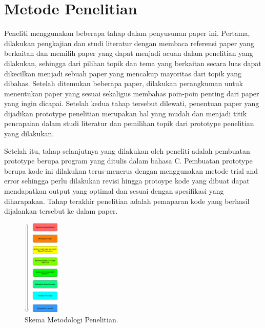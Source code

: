 \documentclass[conference]{IEEEtran}
\begin{document}
\section{Metode Penelitian}
    Peneliti menggunakan beberapa tahap dalam penyusunan
    paper ini. Pertama, dilakukan pengkajian dan studi literatur
    dengan membaca referensi paper yang berkaitan dan memilih
    paper yang dapat menjadi acuan dalam penelitian yang dilakukan, sehingga dari pilihan topik dan tema yang berkaitan
    secara luas dapat dikecilkan menjadi sebuah paper yang mencakup mayoritas dari topik yang dibahas. Setelah ditemukan
    beberapa paper, dilakukan perangkuman untuk menentukan
    paper yang sesuai sekaligus membahas poin-poin penting
    dari paper yang ingin dicapai. Setelah kedua tahap tersebut
    dilewati, penentuan paper yang dijadikan prototype penelitian
    merupakan hal yang mudah dan menjadi titik pencapaian
    dalam studi literatur dan pemilihan topik dari prototype penelitian yang dilakukan.

    Setelah itu, tahap selanjutnya yang dilakukan oleh peneliti
    adalah pembuatan prototype berupa program yang ditulis
    dalam bahasa C. Pembuatan prototype berupa kode ini dilakukan terus-menerus dengan menggunakan metode trial and
    error sehingga perlu dilakukan revisi hingga protoype kode
    yang dibuat dapat mendapatkan output yang optimal dan
    sesuai dengan spesifikasi yang diharapakan. Tahap terakhir
    penelitian adalah pemaparan kode yang berhasil dijalankan tersebut ke dalam paper.

    \begin{figure}[htbp]
        \centerline{\includegraphics[width=0.15\textwidth]{./sources/metodologi_penelitian.png}}
        \caption{Skema Metodologi Penelitian.}
        \label{fig2}
    \end{figure}

\end{document}
